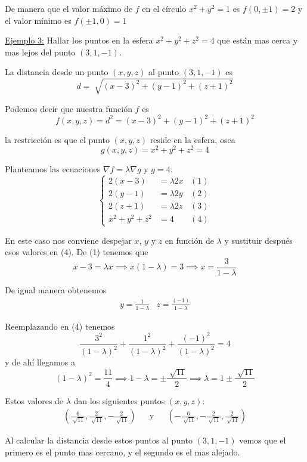 \documentclass[12pt]{article}
\begin{document}
De manera que el valor máximo de $ f $ en el círculo $ x^2+y^2=1 $ es $ f(0,\pm1)=2 $ y el valor mínimo es $ f(\pm1,0)=1 $

\underline{Ejemplo 3:} Hallar los puntos en la esfera $ x^2+y^2+z^2=4 $ que están mas cerca y mas lejos del punto $ (3,1,-1) $.

La distancia desde un punto $ (x,y,z) $ al punto $ (3,1,-1) $ es 
\[
  d=\sqrt[]{(x-3)^2+(y-1)^2+(z+1)^2}
\]

Podemos decir que nuestra función $ f $ es
\[
  f(x,y,z)=d^2=(x-3)^2+(y-1)^2+(z+1)^2
\]

la restricción es que el punto $ (x,y,z) $ reside en la esfera, osea
\[
  g(x,y,z)=x^2+y^2+z^2=4
\]

Planteamos las ecuaciones $ \nabla f=\lambda \nabla g $ y $ g=4 $.
\[
  \left\{
  \begin{aligned}
	  2(x-3) &= \lambda 2x & (1) \\
	  2(y-1) &= \lambda 2y & (2) \\
	  2(z+1) &= \lambda 2z & (3) \\
	  x^2 + y^2 + z^2 &= 4 & (4)
  \end{aligned}
\right.
\]

En este caso nos conviene despejar $ x $, $ y $ y $ z  $ en función de $ \lambda $ y sustituir después esos valores en (4). De (1) tenemos que 
\[
  x-3=\lambda x  \implies x(1-\lambda)=3  \implies x=\frac{3}{1-\lambda}
\]

De igual manera obtenemos
\begin{align*}
  y = \frac{1}{1-\lambda} & z = \frac{(-1)}{1-\lambda}
\end{align*}

Reemplazando en (4) tenemos
\[
  \frac{3^2}{(1-\lambda)^2}+\frac{1^2}{(1-\lambda)^2}+\frac{(-1)^2}{(1-\lambda)^2}=4
\]
y de ahí llegamos a
\[
	(1-\lambda)^2=\frac{11}{4}  \implies 1-\lambda=\pm \frac{\sqrt[]{11}}{2}  \implies \lambda = 1 \pm \frac{\sqrt[]{11}}{2}
\]

Estos valores de $ \lambda $ dan los siguientes puntos $ (x,y,z) $:
\begin{align*}
	\left(\frac{6}{\sqrt[]{11}},\frac{2}{\sqrt[]{11}},-\frac{2}{\sqrt[]{11}}\right) && \text{y} && \left(-\frac{6}{\sqrt[]{11}},-\frac{2}{\sqrt[]{11}},\frac{2}{\sqrt[]{11}}\right)
\end{align*}

Al calcular la distancia desde estos puntos al punto $ (3,1,-1) $ vemos que el primero es el punto mas cercano, y el segundo es el mas alejado.
\end{document}
